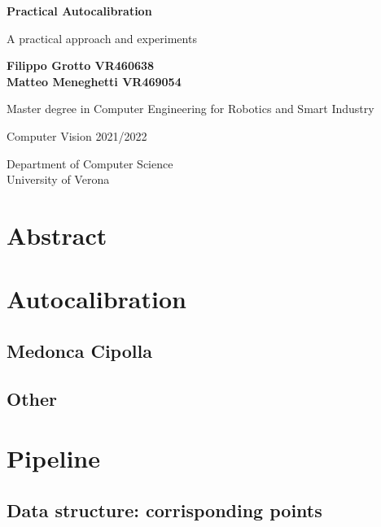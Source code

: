 \documentclass[14pt]{article}
\begin{document}
\begin{titlepage}
\begin{center}
    \vspace*{1cm}    
    \textbf{\LARGE Practical Autocalibration}

    \vspace{0.5cm}
    A practical approach and experiments
            
    \vspace{1.5cm}

    \textbf{Filippo Grotto VR460638 \\ Matteo Meneghetti VR469054}

    \vspace{0.5cm}
    Master degree in Computer Engineering for Robotics and Smart Industry

    \vfill
            
    Computer Vision 2021/2022
            
    \vspace{0.8cm}
                
    Department of Computer Science\\
    University of Verona\\
            
\end{center}
\end{titlepage}

\tableofcontents

\section{Abstract}
\section{Autocalibration}
\subsection{Medonca Cipolla}
\subsection{Other}
\section{Pipeline}
\subsection{Data structure: corrisponding points}
\end{document}
